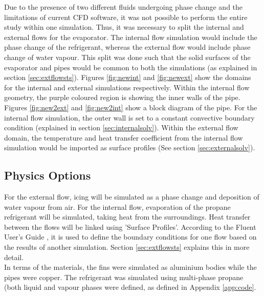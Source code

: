 \documentclass[11pt,a4paper,twoside,oneside]{article}
\begin{document}
Due to the presence of two different fluids undergoing phase change and the limitations of current CFD software, it was not possible to perform the entire study within one simulation. Thus, it was necessary to split the internal and external flows for the evaporator. The internal flow simulation would include the phase change of the refrigerant, whereas the external flow would include phase change of water vapour. This split was done such that the solid surfaces of the evaporator and pipes would be common to both the simulations (as explained in section \ref{sec:extflowsts}). Figures \ref{fig:newint} and \ref{fig:newext} show the domains for the internal and external simulations respectively. Within the internal flow geometry, the purple coloured region is showing the inner walls of the pipe. Figures \ref{fig:new2ext} and \ref{fig:new2int} show a block diagram of the pipe. For the internal flow simulation, the outer wall is set to a constant convective boundary condition (explained in section \ref{sec:internalsolv}). Within the external flow domain, the temperature and heat transfer coefficient from the internal flow simulation would be imported as surface profiles (See section \ref{sec:externalsolv}).

\subsection{Physics Options}
\vspace{0.3cm}
For the external flow, icing will be simulated as a phase change and deposition of water vapour from air. For the internal flow, evaporation of the propane refrigerant will be simulated, taking heat from the surroundings. Heat transfer between the flows will be linked using 'Surface Profiles'. According to the Fluent User's Guide \cite{flug}, it is used to define the boundary conditions for one flow based on the results of another simulation. Section \ref{sec:extflowsts} explains this in more detail.\\
In terms of the materials, the fins were simulated as aluminium bodies while the pipes were copper. The refrigerant was simulated using multi-phase propane (both liquid and vapour phases were defined, as defined in Appendix \ref{app:code}.
\end{document}
